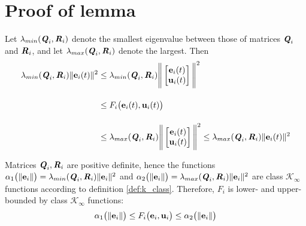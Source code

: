 \section{Proof of lemma }
\label{proof:lemma:F_i_bounded_K_class}

  Let $\lambda_{min}(\bm{\mathit{Q}}_i, \bm{\mathit{R}}_i)$ denote the smallest eigenvalue
  between those of matrices $\bm{\mathit{Q}}_i$ and $\bm{\mathit{R}}_i$, and let
  $\lambda_{max}(\bm{\mathit{Q}}_i, \bm{\mathit{R}}_i)$ denote the largest. Then
  \begin{align}
    \lambda_{min}(\bm{\mathit{Q}}_i, \bm{\mathit{R}}_i)\|\bm{\mathbf{e}}_i(t)\|^2 &\leq
    \lambda_{min}(\bm{\mathit{Q}}_i, \bm{\mathit{R}}_i) \Bigg\| \begin{bmatrix}
        \bm{\mathbf{e}}_i(t) \\
        \bm{\mathbf{u}}_i(t)
      \end{bmatrix}\Bigg\|^2  \\[2.5ex]
      &\leq F_i \big(\bm{\mathbf{e}}_i(t), \bm{\mathbf{u}}_i(t)\big) \\[2.5ex]
      &\leq \lambda_{max}(\bm{\mathit{Q}}_i, \bm{\mathit{R}}_i) \Bigg\| \begin{bmatrix}
        \bm{\mathbf{e}}_i(t) \\
        \bm{\mathbf{u}}_i(t)
      \end{bmatrix}\Bigg\|^2 \leq
    \lambda_{max}(\bm{\mathit{Q}}_i, \bm{\mathit{R}}_i) \|\bm{\mathbf{e}}_i(t)\|^2
  \end{align}

  Matrices $\bm{\mathit{Q}}_i, \bm{\mathit{R}}_i$ are positive definite, hence the functions
  $\alpha_1 \big(\|\bm{\mathbf{e}}_i\|\big) = \lambda_{min}(\bm{\mathit{Q}}_i, \bm{\mathit{R}}_i) \|\bm{\mathbf{e}}_i\|^2$ and
  $\alpha_2 \big(\|\bm{\mathbf{e}}_i\|\big)= \lambda_{max}(\bm{\mathit{Q}}_i, \bm{\mathit{R}}_i) \|\bm{\mathbf{e}}_i\|^2$ are
  class $\mathcal{K}_{\infty}$ functions according to definition \eqref{def:k_class}.
  Therefore, $F_i$ is lower- and upper-bounded by class $\mathcal{K}_{\infty}$
  functions:
  \begin{align}
    \alpha_1\big(\|\bm{\mathbf{e}}_i\|\big) \leq F_i\big(\bm{\mathbf{e}}_i, \bm{\mathbf{u}}_i\big) \leq \alpha_2\big(\| \bm{\mathbf{e}}_i \|\big)
  \end{align}
